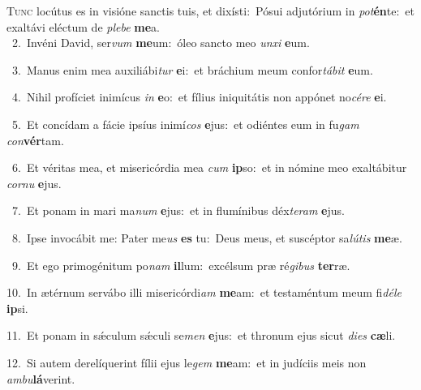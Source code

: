 \lettrine{\initial\textcolor{\initialcolor}{T}}{unc} locútus es in visióne sanctis tuis, et dixísti:~\dagger Pósui adjutórium in \textit{pot}\-\textbf{én}te:~\star et exaltávi eléctum de \textit{ple}\-\textit{be} \textbf{me}\-a.\\
{\numbfont\textcolor{\numbcolor}{~2.}}~Invéni David, ser\textit{vum} \textbf{me}\-um:~\star óleo sancto meo \textit{un}\-\textit{xi} \textbf{e}\-um.\par
{\numbfont\textcolor{\numbcolor}{~3.}}~Manus enim mea auxiliábi\textit{tur} \textbf{e}\-i:~\star et bráchium meum confor\-\textit{tá}\-\textit{bit} \textbf{e}\-um.\par
{\numbfont\textcolor{\numbcolor}{~4.}}~Nihil profíciet inimícus \textit{in} \textbf{e}\-o:~\star et fílius iniquitátis non appónet no\-\textit{cé}\-\textit{re} \textbf{e}\-i.\par
{\numbfont\textcolor{\numbcolor}{~5.}}~Et concídam a fácie ipsíus inimí\textit{cos} \textbf{e}\-jus:~\star et odiéntes eum in fu\textit{gam} \textit{con}\-\textbf{vér}tam.\par
{\numbfont\textcolor{\numbcolor}{~6.}}~Et véritas mea, et misericórdia mea \textit{cum} \textbf{ip}\-so:~\star et in nómine meo exaltábitur \textit{cor}\-\textit{nu} \textbf{e}\-jus.\par
{\numbfont\textcolor{\numbcolor}{~7.}}~Et ponam in mari ma\textit{num} \textbf{e}\-jus:~\star et in flumínibus déx\-\textit{te}\-\textit{ram} \textbf{e}\-jus.\par
{\numbfont\textcolor{\numbcolor}{~8.}}~Ipse invocábit me: Pater me\textit{us} \textbf{es} tu:~\star Deus meus, et suscéptor sa\-\textit{lú}\-\textit{tis} \textbf{me}\-æ.\par
{\numbfont\textcolor{\numbcolor}{~9.}}~Et ego primogénitum po\textit{nam} \textbf{il}\-lum:~\star excélsum præ ré\-\textit{gi}\-\textit{bus} \textbf{ter}\-ræ.\par
{\numbfont\textcolor{\numbcolor}{10.}}~In ætérnum servábo illi misericórdi\textit{am} \textbf{me}\-am:~\star et testaméntum meum fi\-\textit{dé}\-\textit{le} \textbf{ip}\-si.\par
{\numbfont\textcolor{\numbcolor}{11.}}~Et ponam in sǽculum sǽculi se\textit{men} \textbf{e}\-jus:~\star et thronum ejus sicut \textit{di}\-\textit{es} \textbf{cæ}\-li.\par
{\numbfont\textcolor{\numbcolor}{12.}}~Si autem derelíquerint fílii ejus le\textit{gem} \textbf{me}\-am:~\star et in judíciis meis non \textit{am}\-\textit{bu}\textbf{lá}verint.\par
